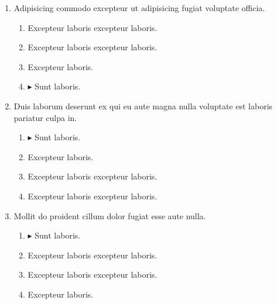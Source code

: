 \documentclass[a4paper,12pt]{article}
\begin{document}
\begin{enumerate}[label=\textbf{\arabic*.}]
\begin{multicols}{2}
\begin{enumerate}
	\end{enumerate}

\end{multicols}
\item Adipisicing commodo excepteur ut adipisicing fugiat voluptate officia.
\begin{multicols}{2}
	\begin{enumerate}
		\item  Excepteur laboris excepteur laboris.
  
		\item  Excepteur laboris excepteur laboris.
    
		\item  Excepteur laboris.
    
		\item $\blacktriangleright$  Sunt laboris.
    
	\end{enumerate}

\end{multicols}
\item Duis laborum deserunt ex qui eu aute magna nulla voluptate est laboris pariatur culpa in.
\begin{multicols}{2}
	\begin{enumerate}
		\item $\blacktriangleright$  Sunt laboris.
    
		\item  Excepteur laboris.
    
		\item  Excepteur laboris excepteur laboris.
    
		\item  Excepteur laboris excepteur laboris.
  
	\end{enumerate}

\end{multicols}
\item Mollit do proident cillum dolor fugiat esse aute nulla.
\begin{multicols}{2}
	\begin{enumerate}
		\item $\blacktriangleright$  Sunt laboris.
    
		\item  Excepteur laboris excepteur laboris.
    
		\item  Excepteur laboris excepteur laboris.
  
		\item  Excepteur laboris.
    

\end{enumerate}
\end{multicols}
\end{enumerate}
\end{document}
